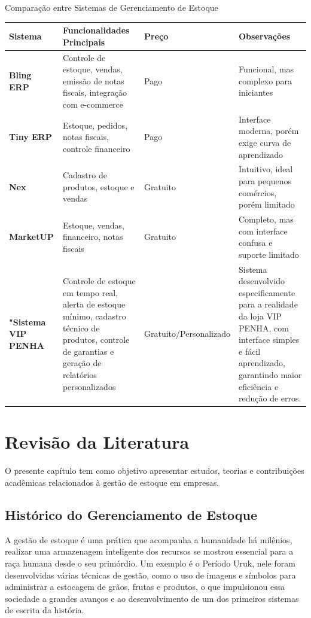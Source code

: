 \documentclass[
	12pt,				%
	openany,			%
	twoside,			%
	a4paper,			%
	english,			%
	brazil				%
	]{abntex2}
\begin{document}
\begin{quadro}[htb]
\caption{\label{quadro_comparativo}Comparação entre Sistemas de Gerenciamento de Estoque}
\begin{tabular}{|p{3.2cm}|p{5.5cm}|p{2.2cm}|p{4.1cm}|}
\hline
\textbf{Sistema} & \textbf{Funcionalidades Principais} & \textbf{Preço} & \textbf{Observações} \\
\hline
\textbf{Bling ERP} & Controle de estoque, vendas, emissão de notas fiscais, integração com e-commerce & Pago & Funcional, mas complexo para iniciantes \\
\hline
\textbf{Tiny ERP} & Estoque, pedidos, notas fiscais, controle financeiro & Pago & Interface moderna, porém exige curva de aprendizado \\
\hline
\textbf{Nex} & Cadastro de produtos, estoque e vendas & Gratuito & Intuitivo, ideal para pequenos comércios, porém limitado \\
\hline
\textbf{MarketUP} & Estoque, vendas, financeiro, notas fiscais & Gratuito & Completo, mas com interface confusa e suporte limitado \\
\hline
\textbf{"Sistema VIP PENHA} & Controle de estoque em tempo real, alerta de estoque mínimo, cadastro técnico de produtos, controle de garantias e geração de relatórios personalizados & Gratuito/Personalizado & Sistema desenvolvido especificamente para a realidade da loja VIP PENHA, com interface simples e fácil aprendizado, garantindo maior eficiência e redução de erros. \\
\hline
\end{tabular}
\end{quadro}



\chapter{Revisão da Literatura}
O presente capítulo tem como objetivo apresentar estudos, teorias e contribuições acadêmicas relacionados à gestão de estoque em empresas.
\section{Histórico do Gerenciamento de Estoque}
A gestão de estoque é uma prática que acompanha a humanidade há milênios, realizar uma armazenagem inteligente dos recursos se mostrou essencial para a raça humana desde o seu primórdio. Um exemplo é o Período Uruk, nele foram desenvolvidas várias técnicas de gestão, como o uso de imagens e símbolos para administrar a estocagem de grãos, frutas e produtos, o que impulsionou essa sociedade a grandes avanços e ao desenvolvimento de um dos primeiros sistemas de escrita da história. \cite{Albright1996}
\end{document}
